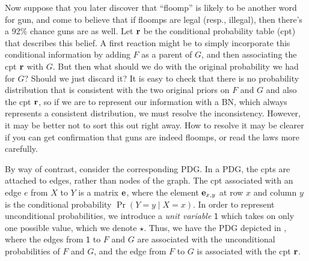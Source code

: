 \documentclass{article}
\newcommand{\MN}{PDG}
\numberwithin{equation}{section}
\begin{document}
\begin{example}
		Now suppose that you later discover that ``floomp'' is likely to be another word for gun, and come to believe that if floomps are legal (resp., illegal), then there's a 92\% chance guns are as well. Let $\mathbf r$ be the conditional probability table (cpt) that describes this belief. A first reaction might be to simply incorporate this conditional information by adding $F$ as a parent of $G$, and then associating the cpt $\mathbf r$ with $G$. But then what should we do with the original probability we had for $G$?  Should we just discard it?
		It is easy to check that there is no probability distribution that is consistent with the two original priors on $F$ and $G$ and also the cpt $\mathbf r$, so if we are to represent our information with a BN, which always represents a consistent distribution, we must resolve the inconsistency.  
%		
		However, it may be better not to sort this out right away. How to resolve it may be clearer if you can get confirmation that guns are indeed floomps, or read the laws more carefully.

		By way of contrast, consider the corresponding \MN.
		In a \MN, the cpts are attached to edges, rather than nodes of the graph. The cpt associated with an edge $e$ from $X$ to $Y$ is a matrix $\mathbf e$, where the element $\mathbf e_{x,y}$ at row $x$ and column $y$ is the conditional probability $\Pr(Y \!\!=\!\!y \mid X \!\!=\!\! x)$. In order to represent unconditional probabilities, we introduce a \emph{unit variable} $\mathsf 1$ which takes on only one possible value,	which we denote $\star$. Thus, we have the PDG depicted in , where the edges from $\mathsf 1$ to $F$ and $G$ are associated with the unconditional probabilities of $F$ and $G$, and the edge from $F$ to $G$ is associated with the cpt $\mathbf r$.
		\begin{figure}[h]
			\centering
\end{figure}
\end{example}
\end{document}

